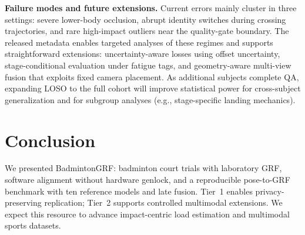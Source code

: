 \documentclass[sigconf,screen]{acmart}
\begin{document}
\noindent\textbf{Failure modes and future extensions.}
Current errors mainly cluster in three settings: severe lower-body occlusion, abrupt identity switches during crossing trajectories, and rare high-impact outliers near the quality-gate boundary.
The released metadata enables targeted analyses of these regimes and supports straightforward extensions: uncertainty-aware losses using offset uncertainty, stage-conditional evaluation under fatigue tags, and geometry-aware multi-view fusion that exploits fixed camera placement.
As additional subjects complete QA, expanding LOSO to the full cohort will improve statistical power for cross-subject generalization and for subgroup analyses (e.g., stage-specific landing mechanics).

\section{Conclusion}
We presented BadmintonGRF: badminton court trials with laboratory GRF, software alignment without hardware genlock, and a reproducible pose-to-GRF benchmark with ten reference models and late fusion.
Tier~1 enables privacy-preserving replication; Tier~2 supports controlled multimodal extensions. We expect this resource to advance impact-centric load estimation and multimodal sports datasets.


\clearpage
\balance


\end{document}
